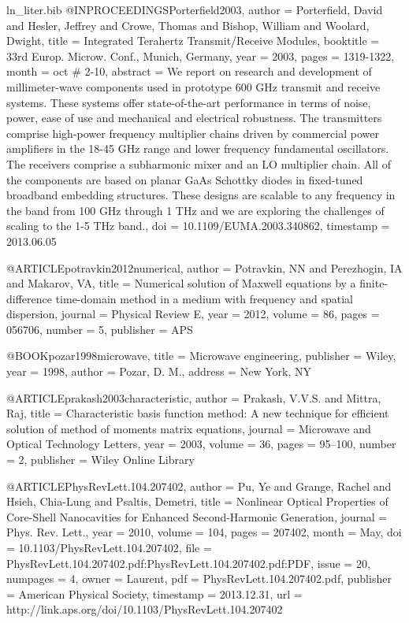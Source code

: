 \begin{filecontents*}{ln_liter.bib}
@INPROCEEDINGS{Porterfield2003,
  author = {Porterfield, David and Hesler, Jeffrey and Crowe, Thomas and Bishop,
	William and Woolard, Dwight},
  title = {Integrated Terahertz Transmit/Receive Modules},
  booktitle = {33rd Europ. Microw. Conf., Munich, Germany},
  year = {2003},
  pages = {1319-1322},
  month = oct # { 2-10},
  abstract = {We report on research and development of millimeter-wave components
	used in prototype 600 GHz transmit and receive systems. These systems
	offer state-of-the-art performance in terms of noise, power, ease
	of use and mechanical and electrical robustness. The transmitters
	comprise high-power frequency multiplier chains driven by commercial
	power amplifiers in the 18-45 GHz range and lower frequency fundamental
	oscillators. The receivers comprise a subharmonic mixer and an LO
	multiplier chain. All of the components are based on planar GaAs
	Schottky diodes in fixed-tuned broadband embedding structures. These
	designs are scalable to any frequency in the band from 100 GHz through
	1 THz and we are exploring the challenges of scaling to the 1-5 THz
	band.},
  doi = {10.1109/EUMA.2003.340862},
  timestamp = {2013.06.05}
}

@ARTICLE{potravkin2012numerical,
  author = {Potravkin, NN and Perezhogin, IA and Makarov, VA},
  title = {Numerical solution of {M}axwell equations by a finite-difference
	time-domain method in a medium with frequency and spatial dispersion},
  journal = {Physical Review E},
  year = {2012},
  volume = {86},
  pages = {056706},
  number = {5},
  publisher = {APS}
}

@BOOK{pozar1998microwave,
  title = {Microwave engineering},
  publisher = {Wiley},
  year = {1998},
  author = {Pozar, D. M.},
  address = {New York, NY}
}

@ARTICLE{prakash2003characteristic,
  author = {Prakash, V.V.S. and Mittra, Raj},
  title = {Characteristic basis function method: A new technique for efficient
	solution of method of moments matrix equations},
  journal = {Microwave and Optical Technology Letters},
  year = {2003},
  volume = {36},
  pages = {95--100},
  number = {2},
  publisher = {Wiley Online Library}
}

@ARTICLE{PhysRevLett.104.207402,
  author = {Pu, Ye and Grange, Rachel and Hsieh, Chia-Lung and Psaltis, Demetri},
  title = {Nonlinear Optical Properties of Core-Shell Nanocavities for Enhanced
	Second-Harmonic Generation},
  journal = {Phys. Rev. Lett.},
  year = {2010},
  volume = {104},
  pages = {207402},
  month = {May},
  doi = {10.1103/PhysRevLett.104.207402},
  file = {PhysRevLett.104.207402.pdf:PhysRevLett.104.207402.pdf:PDF},
  issue = {20},
  numpages = {4},
  owner = {Laurent},
  pdf = {PhysRevLett.104.207402.pdf},
  publisher = {American Physical Society},
  timestamp = {2013.12.31},
  url = {http://link.aps.org/doi/10.1103/PhysRevLett.104.207402}
}


\end{filecontents*}
